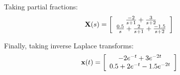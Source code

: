 Taking partial fractions:
\[
{\bf{X}}(s) = \left[ {\begin{array}{*{20}c}
   {\frac{{ - 2}}{{s + 1}} + \frac{3}{{s + 2}}}  \\
   {\frac{{0.5}}{s} + \frac{2}{{s + 1}} + \frac{{ - 1.5}}{{s + 2}}}  \\
\end{array}} \right]
\]

Finally, taking inverse Laplace transforms:
\[
{\bf{x}}(t) = \left[ {\begin{array}{*{20}c}
   { - 2e^{ - t}  + 3e^{ - 2t} }  \\
   {0.5 + 2e^{ - t}  - 1.5e^{ - 2t} }  \\
\end{array}} \right]
\]





\endinput

